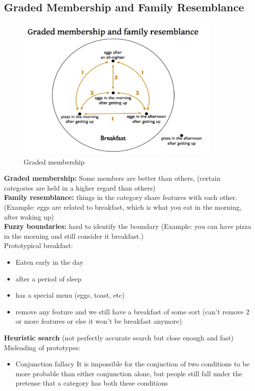 \documentclass{article}
\begin{document}
\subsection{Graded Membership and Family Resemblance}

\begin{figure}[htp]
\centering
\includegraphics[width=10cm]{images/Breakfast.JPG}
\caption{Graded membership}
\label{fig: Graded Membership}
\end{figure}

\noindent \textbf{Graded membership:} Some members are better than others, (certain categories are held in a higher regard than others) \\
\textbf{Family resemblance:} things in the category share features with each other. (Example: eggs are related to breakfast, which is what you eat in the morning, after waking up) \\
\textbf{Fuzzy boundaries:} hard to identify the boundary (Example: you can have pizza in the morning and still consider it breakfast.) \\

Prototypical breakfast: 
\begin{itemize}
    \item Eaten early in the day
    \item after a period of sleep 
    \item has a special menu (eggs, toast, etc)
    \item remove any feature and we still have a breakfast of some sort (can't remove 2 or more features or else it won't be breakfast anymore)
\end{itemize}
\textbf{Heuristic search} (not perfectly accurate search but close enough and fast) \\

\noindent Misleading of prototypes: 
\begin{itemize}
    \item Conjunction fallacy
        \subitem It is impossible for the conjuction of two conditions to be more probable than either conjunction alone, but people still fall under the pretense that a category has both these conditions 
\end{itemize}
\end{document}
